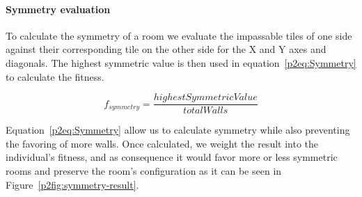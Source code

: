 

\paragraph{Symmetry evaluation}


To calculate the symmetry of a room we evaluate the impassable tiles of one side against their corresponding tile on the other side for the X and Y axes and diagonals. The highest symmetric value is then used in equation~\ref{p2eq:Symmetry} to calculate the fitness.

\begin{equation} \label{p2eq:Symmetry}
f_{symmetry} = \frac{highestSymmetricValue} {totalWalls}
\end{equation}

Equation~\ref{p2eq:Symmetry} allow us to calculate symmetry while also preventing the favoring of more walls. Once calculated, we weight the result into the individual's fitness, and as consequence it would favor more or less symmetric rooms and preserve the room's configuration as it can be seen in Figure~\ref{p2fig:symmetry-result}.

